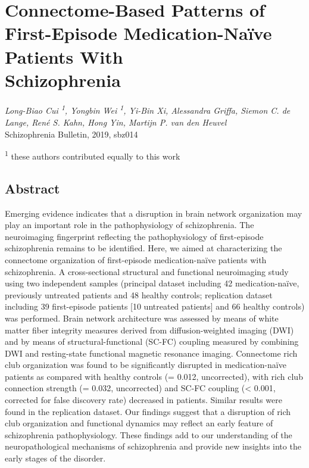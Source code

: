 \pagestyle{MyStyle}

\chapter[Connectome in first-episode schizophrenia]{Connectome-Based Patterns of First-Episode Medication-Na\"{i}ve Patients With \\Schizophrenia}
\label{ch:fourthpaper}

\begin{refsection}

\begin{flushright}
\textit{Long-Biao Cui \textsuperscript{1}, Yongbin Wei \textsuperscript{1}, Yi-Bin Xi, Alessandra Griffa, Siemon C. de Lange, René S. Kahn, Hong Yin, Martijn P. van den Heuvel}\\
Schizophrenia Bulletin, 2019, sbz014

\vspace{5 mm}

\textsuperscript{1} these authors contributed equally to this work\\

\vspace{7 mm}

\end{flushright}

\newpage
\section*{Abstract}
Emerging evidence indicates that a disruption in brain network organization may play an important role in the pathophysiology of schizophrenia. The neuroimaging fingerprint reflecting the pathophysiology of first-episode schizophrenia remains to be identified. Here, we aimed at characterizing the connectome organization of first-episode medication-na\"{i}ve patients with schizophrenia. A cross-sectional structural and functional neuroimaging study using two independent samples (principal dataset including 42 medication-na\"{i}ve, previously untreated patients and 48 healthy controls; replication dataset including 39 first-episode patients [10 untreated patients] and 66 healthy controls) was performed. Brain network architecture was assessed by means of white matter fiber integrity measures derived from diffusion-weighted imaging (DWI) and by means of structural-functional (SC-FC) coupling measured by combining DWI and resting-state functional magnetic resonance imaging. Connectome rich club organization was found to be significantly disrupted in medication-na\"{i}ve patients as compared with healthy controls (\pval = 0.012, uncorrected), with rich club connection strength (\pval = 0.032, uncorrected) and SC-FC coupling (\pval < 0.001, corrected for false discovery rate) decreased in patients. Similar results were found in the replication dataset. Our findings suggest that a disruption of rich club organization and functional dynamics may reflect an early feature of schizophrenia pathophysiology. These findings add to our understanding of the neuropathological mechanisms of schizophrenia and provide new insights into the early stages of the disorder.


\end{refsection}

